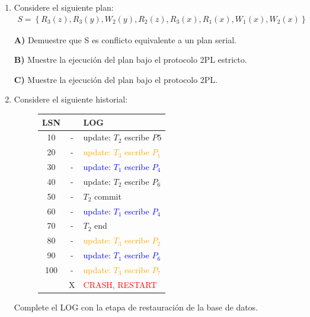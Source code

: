 \documentclass{templateNote}
\begin{document}
\begin{enumerate}
    \item Considere el siguiente plan:
    \begin{align*}
        S = \left\{R_3(z), R_3(y), W_2(y), R_2(z), R_3(x), R_1(x), W_1(x), W_2(x)\right\}
    \end{align*}


    \textbf{A)} Demuestre que S es conflicto equivalente a un plan serial.
    
    \textbf{B)} Muestre la ejecución del plan bajo el protocolo 2PL estricto.
    
    \textbf{C)} Muestre la ejecución del plan bajo el protocolo 2PL.

    \item Considere el siguiente historial:
    \begin{figure}[H]
        \centering
        \begin{tabular}{|c|c|l|}
            \hline
            \textbf{LSN} & & \textbf{LOG} \\ \hline
            10 & - & \textcolor{green!80!black}{update: $T_2$ escribe $P5$} \\
            20 & - & \textcolor{orange}{update: $T_3$ escribe $P_1$} \\
            30 & - & \textcolor{blue}{update: $T_1$ escribe $P_4$} \\
            40 & - & \textcolor{green!80!black}{update: $T_2$ escribe $P_6$} \\
            50 & - & \textcolor{green!80!black}{$T_2$ commit} \\
            60 & - & \textcolor{blue}{update: $T_1$ escribe $P_4$} \\
            70 & - & \textcolor{green!80!black}{$T_2$ end} \\
            80 & - & \textcolor{orange}{update: $T_3$ escribe $P_2$} \\
            90 & - & \textcolor{blue}{update: $T_1$ escribe $P_6$} \\
            100 & - & \textcolor{orange}{update: $T_3$ escribe $P_7$} \\
            & X & \textcolor{red}{CRASH, RESTART} \\ \hline
        \end{tabular}   
    \end{figure}

    Complete el LOG con la etapa de restauración de la base de datos.


\end{enumerate}
\end{document}
